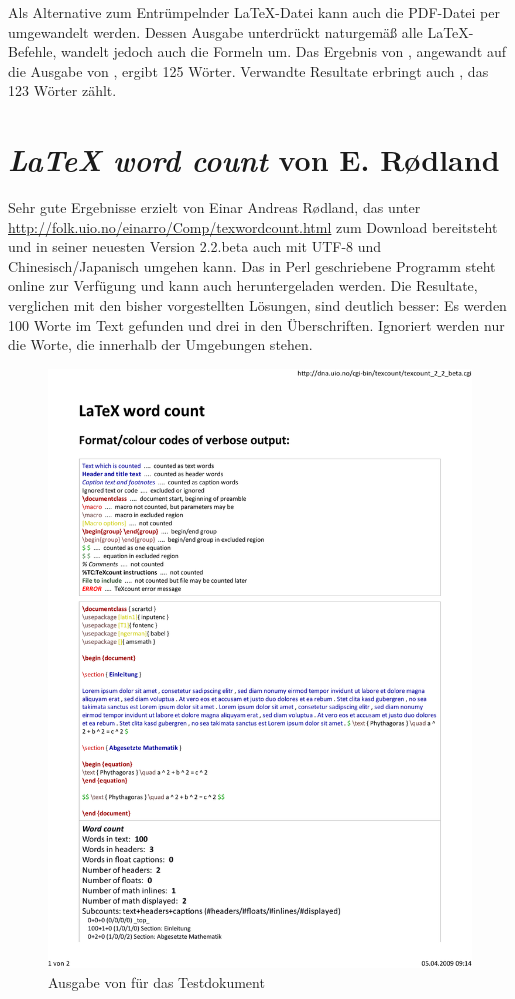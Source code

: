 \documentclass[ngerman]{dtk}
\begin{document}
Als Alternative zum \glqq Entrümpeln\grqq der \LaTeX-Datei kann auch die PDF-Datei per  umgewandelt werden. Dessen Ausgabe unterdrückt naturgemäß alle LaTeX-Befehle, wandelt jedoch auch die Formeln um. Das Ergebnis von , angewandt auf die Ausgabe von , ergibt 125 Wörter. Verwandte Resultate erbringt auch , das 123 Wörter zählt.

\section{\textit{LaTeX word count} von E. R\o dland}

Sehr gute Ergebnisse erzielt  von Einar Andreas R\o dland, das unter \url{http://folk.uio.no/einarro/Comp/texwordcount.html} zum Download bereitsteht und in seiner neuesten Version 2.2.beta auch mit UTF-8 und Chinesisch/Japanisch umgehen kann. Das in Perl geschriebene Programm steht online zur Verfügung und kann auch heruntergeladen werden. Die Resultate, verglichen mit den bisher vorgestellten Lösungen, sind deutlich besser: Es werden 100 Worte im Text gefunden und drei in den  Überschriften. Ignoriert werden nur die Worte, die innerhalb der  Umgebungen stehen.

\begin{figure}
	\centering
		\includegraphics[width=\textwidth]{texwordcount.pdf}
		\caption{Ausgabe von  für das Testdokument}
	\label{fig:texwordcount}
\end{figure}
\end{document}
